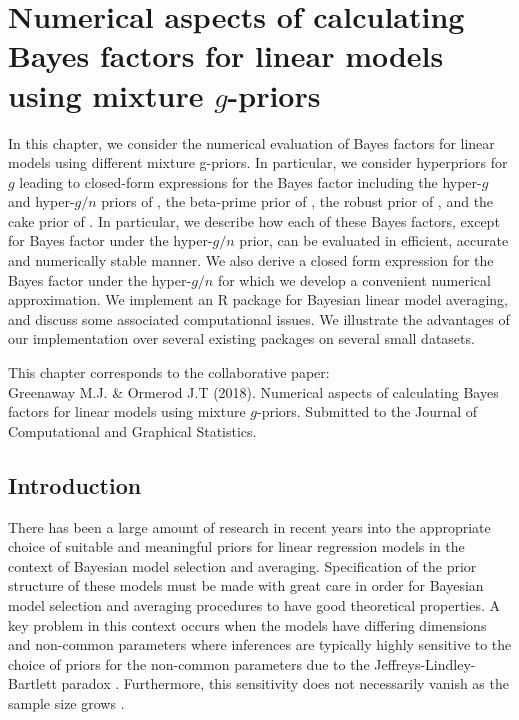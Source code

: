 
\chapter{Numerical aspects of calculating Bayes factors for linear models using
	mixture $g$-priors
	}



\noindent
In this chapter, we consider the numerical evaluation of Bayes factors for linear models using different mixture g-priors. In particular, we consider hyperpriors for $g$ leading to closed-form expressions for the Bayes factor including the hyper-$g$ and hyper-$g/n$ priors of \cite{Liang2008}, the beta-prime prior of \cite{Maruyama2011}, the robust prior of \cite{Bayarri2012}, and the cake prior of \cite{OrmerodEtal2017}. In particular, we describe how each of these Bayes factors, except for Bayes factor under the hyper-$g/n$ prior, can be evaluated in efficient, accurate and numerically stable manner. We also derive a closed form expression for the Bayes factor under
the hyper-$g/n$ for which we develop a convenient numerical approximation. We implement an R package for Bayesian linear model averaging, and discuss some associated computational issues. We illustrate the advantages of our implementation over several existing packages on several small datasets.


\vfill
{\footnotesize
\noindent	
	This chapter corresponds to the collaborative paper: \\
	Greenaway M.J. \& Ormerod J.T (2018).
	Numerical aspects of calculating Bayes factors for linear models using mixture $g$-priors. Submitted to the Journal of Computational and Graphical Statistics.
}

\newpage 

 
\section{Introduction}

 
There has been a large amount of research in recent years into the appropriate choice of suitable 
and meaningful priors for linear regression models in the context of Bayesian model selection and 
averaging. Specification of the prior structure of these models must be made with great care in 
order for Bayesian model selection and averaging procedures to have good theoretical properties. 
A key problem in this context occurs when the models have differing dimensions and non-common 
parameters where inferences are typically highly sensitive to the choice of priors for the 
non-common parameters due to the Jeffreys-Lindley-Bartlett paradox \citep{Lindley1957,Bartlett1957,OrmerodEtal2017}.
Furthermore, this sensitivity does not necessarily vanish as the sample size 
grows \citep{Kass1995,Berger2001}.  

